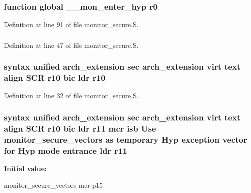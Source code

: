 \hypertarget{monitor__secure_8_s_a52d1ac37c436f49666d8e195af78d552}{
\subsubsection[{r0}]{\setlength{\rightskip}{0pt plus 5cm}function global {\bf \-\_\-\-\_\-mon\-\_\-enter\-\_\-hyp} {\bf r0}}}\label{monitor__secure_8_s_a52d1ac37c436f49666d8e195af78d552}


\-Definition at line 91 of file monitor\-\_\-secure.\-S.

\hypertarget{monitor__secure_8_s_a9936d57a6e416957ad6f37e2a80f3757}{
\subsubsection[{r1}]{}}\label{monitor__secure_8_s_a9936d57a6e416957ad6f37e2a80f3757}


\-Definition at line 47 of file monitor\-\_\-secure.\-S.

\hypertarget{monitor__secure_8_s_ac3bf51173e39a81ec089049af2b9b854}{
\subsubsection[{r10}]{\setlength{\rightskip}{0pt plus 5cm}syntax unified arch\-\_\-extension sec arch\-\_\-extension virt text align \-S\-C\-R {\bf r10} bic ldr {\bf r10}}}\label{monitor__secure_8_s_ac3bf51173e39a81ec089049af2b9b854}


\-Definition at line 32 of file monitor\-\_\-secure.\-S.

\hypertarget{monitor__secure_8_s_a8788e5e3f963472b5ed8405a3340c314}{
\subsubsection[{r11}]{\setlength{\rightskip}{0pt plus 5cm}syntax unified arch\-\_\-extension sec arch\-\_\-extension virt text align \-S\-C\-R {\bf r10} bic ldr {\bf r11} mcr {\bf isb} \-Use {\bf monitor\-\_\-secure\-\_\-vectors} as temporary \-Hyp exception vector for \-Hyp mode entrance ldr {\bf r11}}}\label{monitor__secure_8_s_a8788e5e3f963472b5ed8405a3340c314}
{\bfseries \-Initial value\-:}
\begin{DoxyCode}
monitor_secure_vectors
    mcr p15
\end{DoxyCode}


